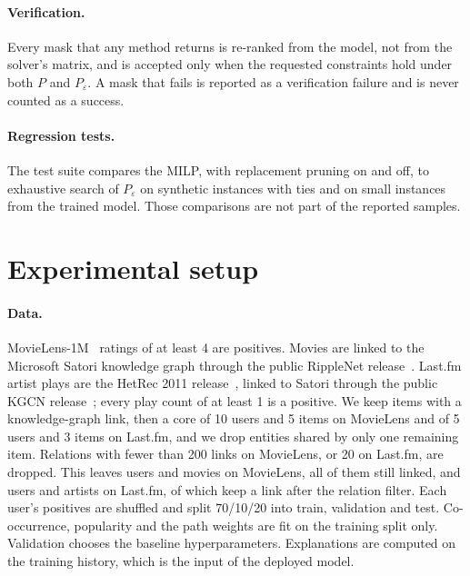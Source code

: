 \documentclass[11pt]{article}
\newcommand{\Peps}{P_\varepsilon}
\begin{document}
\paragraph{Verification.} Every mask that any method returns is re-ranked from the model, not from the solver's
matrix, and is accepted only when the requested constraints hold under both $P$ and $\Peps$. A mask that fails is
reported as a verification failure and is never counted as a success.

\paragraph{Regression tests.} The test suite compares the MILP, with replacement pruning on and off, to exhaustive
search of $\Peps$ on synthetic instances with ties and on small instances from the trained model. Those comparisons
are not part of the reported samples.



\section{Experimental setup}
\label{sec:setup}

\paragraph{Data.} MovieLens-1M~\cite{harper2015movielens} ratings of at least 4 are positives. Movies are linked to the
Microsoft Satori knowledge graph through the public RippleNet release~\cite{wang2018ripplenet}. Last.fm artist plays are
the HetRec 2011 release~\cite{cantador2011hetrec}, linked to Satori through the public KGCN release~\cite{wang2019kgcn};
every play count of at least 1 is a positive. We keep items with a knowledge-graph link, then a core of 10 users and 5
items on MovieLens and of 5 users and 3 items on Last.fm, and we drop entities shared by only one remaining item.
Relations with fewer than 200 links on MovieLens, or 20 on Last.fm, are dropped. This leaves \MLDataUsers{} users and
\MLDataItems{} movies on MovieLens, all of them still linked, and \LFDataUsers{} users and \LFDataItems{} artists on
Last.fm, of which \LFItemsKG{} keep a link after the relation filter. Each user's positives are shuffled and split
70/10/20 into train, validation and test. Co-occurrence, popularity and the path weights are fit on the training split
only. Validation chooses the baseline hyperparameters. Explanations are computed on the training history, which is the
input of the deployed model.
\end{document}
